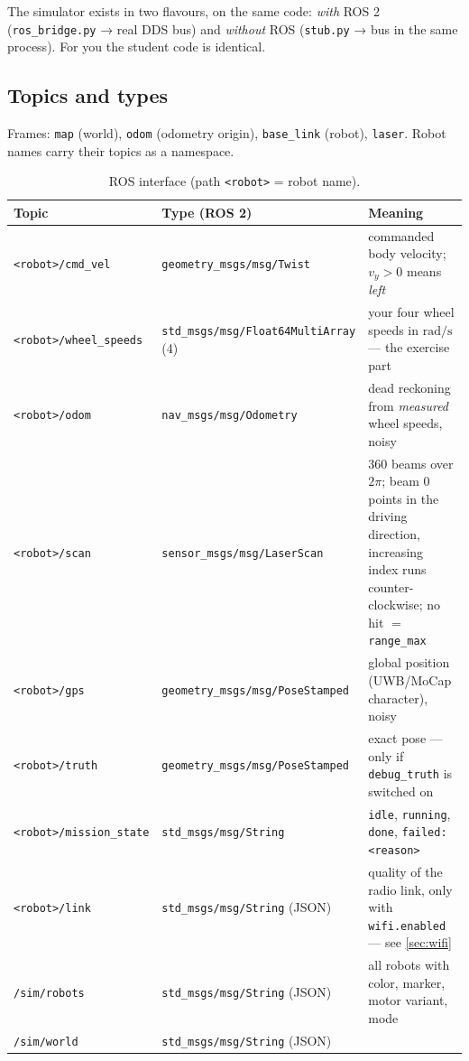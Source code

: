 \documentclass[12pt,a4paper]{scrartcl}
\newcommand{\thema}[1]{\texttt{#1}}
\newcommand{\ordner}[1]{\texttt{#1}}
\begin{document}
The simulator exists in two flavours, on the same code:
\emph{with} ROS 2 (\ordner{ros\_bridge.py} → real DDS bus) and \emph{without} ROS
(\ordner{stub.py} → bus in the same process). For you the student code is identical.

\subsection{Topics and types}
Frames: \thema{map} (world), \thema{odom} (odometry origin), \thema{base\_link}
(robot), \thema{laser}. Robot names carry their topics as a namespace.

\begin{table}[ht]\centering\small
\caption{ROS interface (path \thema{<robot>} = robot name).}
\label{tab:themen}
\begin{tabular}{@{}p{4.3cm}p{4.9cm}p{5.2cm}@{}}
\toprule
Topic & Type (ROS 2) & Meaning \\
\midrule
\thema{<robot>/cmd\_vel} & \thema{geometry\_msgs/msg/Twist}
  & commanded body velocity; \(v_y>0\) means \emph{left} \\
\thema{<robot>/wheel\_speeds} & \thema{std\_msgs/msg/Float64MultiArray} (4)
  & your four wheel speeds in \(\mathrm{rad/s}\) — the exercise part \\
\thema{<robot>/odom} & \thema{nav\_msgs/msg/Odometry}
  & dead reckoning from \emph{measured} wheel speeds, noisy \\
\thema{<robot>/scan} & \thema{sensor\_msgs/msg/LaserScan}
  & 360 beams over \(2\pi\); beam 0 points in the driving direction, increasing index
  runs counter-clockwise; no hit \(=\) \thema{range\_max} \\
\thema{<robot>/gps} & \thema{geometry\_msgs/msg/PoseStamped}
  & global position (UWB/MoCap character), noisy \\
\thema{<robot>/truth} & \thema{geometry\_msgs/msg/PoseStamped}
  & exact pose — only if \thema{debug\_truth} is switched on \\
\thema{<robot>/mission\_state} & \thema{std\_msgs/msg/String}
  & \thema{idle}, \thema{running}, \thema{done}, \thema{failed:<reason>} \\
\thema{<robot>/link} & \thema{std\_msgs/msg/String} (JSON)
  & quality of the radio link, only with \thema{wifi.enabled} — see \cref{sec:wifi} \\
\thema{/sim/robots} & \thema{std\_msgs/msg/String} (JSON)
  & all robots with color, marker, motor variant, mode \\
\thema{/sim/world} & \thema{std\_msgs/msg/String} (JSON)

\end{tabular}
\end{table}
\end{document}
